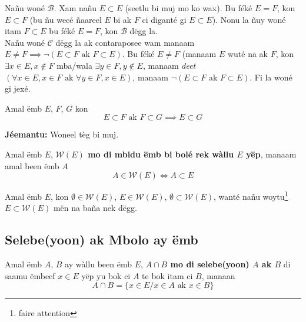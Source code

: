 \documentclass[twoside, a4paper]{article}
\begin{document}
Nañu woné $\mathcal{B}$. Xam nañu $E\subset E$ (seetlu bi muj mo ko wax). Bu féké $E=F$, kon $E \subset F$ (bu ñu wecé ñaareel $E$ bi ak $F$ ci diganté gi $E\subset E$). Nonu la ñuy woné itam $F\subset E$ bu féké $E=F$, kon $\mathcal{B}$ dëgg la. \\

Nañu woné $\mathcal{C}$ dëgg la ak contaraposee wam manaam $E \neq F \implies \neg (E \subset F \text{ ak } F \subset E)$. Bu féké $E \neq F$ (manaam $E$ wuté na ak $F$, kon $\exists x \in E, x \not\in F$ mba/wala $\exists y \in F, y \not\in E$, manaam \textit{deet}$(\forall x \in E, x \in F \text{ ak } \forall y \in F, x\in E)$, manaam $\neg (E \subset F \text{ ak } F \subset E)$. Fi la woné gi jexé.


\begin{tcolorbox}[enhanced jigsaw,breakable,pad at break*=1mm, colback=blue!5!white,colframe=white!75!black,title= Tèg\footnote{Proposition},
  watermark color=white]
Amal ëmb $E$, $F$, $G$ kon 
$$E \subset F \text{ ak } F \subset G \implies E \subset G$$
\end{tcolorbox}
\textbf{Jéemantu:} Woneel tèg bi muj.

\begin{tcolorbox}[enhanced jigsaw,breakable,pad at break*=1mm, colback=red!5!white,colframe=white!75!black,title= Téeki,watermark color=white]
Amal ëmb $E$, \textbf{$\mathcal{W}(E)$ mo di mbidu ëmb bi bolé rek wàllu $E$ yëp}, manaam amal been ëmb $A$
$$A\in \mathcal{W}(E) \iff A \subset E$$
\end{tcolorbox}
Amal ëmb $E$, kon $\emptyset \in \mathcal{W}(E)$, $E \in \mathcal{W}(E)$, $\emptyset \subset \mathcal{W}(E)$, wanté nañu woytu\footnote{faire attention} $E \subset \mathcal{W}(E)$ mën na baña nek dëgg.


\subsection{Selebe(yoon) ak Mbolo ay ëmb}

\begin{tcolorbox}[enhanced jigsaw,breakable,pad at break*=1mm, colback=red!5!white,colframe=white!75!black,title= Téeki,watermark color=white]
Amal ëmb $A$, $B$ ay wàllu been ëmb $E$, \textbf{$A\cap B$ mo di selebe(yoon) $A$ ak $B$} di saamu ëmbeef $x\in E$ yëp yu bok ci $A$ te bok itam ci $B$, manaan $$A\cap B = \big\{x \in E/ x \in A \text{ ak } x \in B\big\}$$
\end{tcolorbox}
\end{document}
